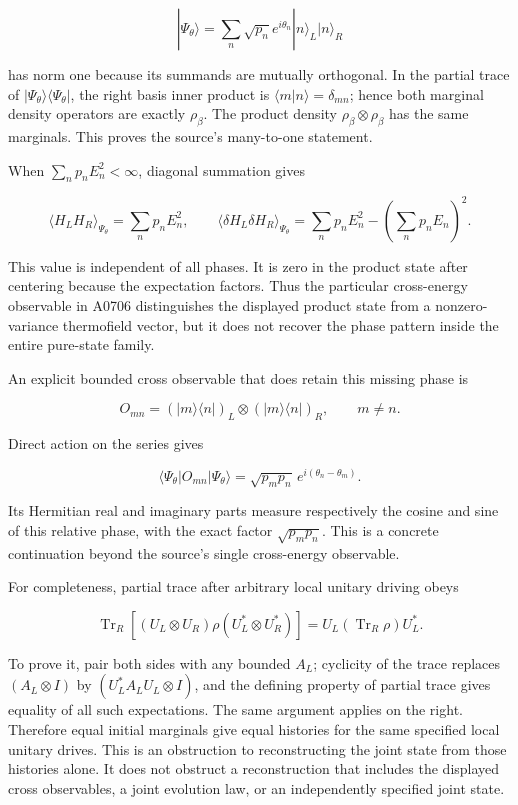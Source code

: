 \[
|\Psi_\theta\rangle=\sum_n\sqrt{p_n}e^{i\theta_n}|n\rangle_L|n\rangle_R
\]

has norm one because its summands are mutually orthogonal. In the
partial trace of \(|\Psi_\theta\rangle\langle\Psi_\theta|\), the right
basis inner product is \(\langle m|n\rangle=\delta_{mn}\); hence both
marginal density operators are exactly \(\rho_\beta\). The product
density \(\rho_\beta\otimes\rho_\beta\) has the same marginals. This
proves the source's many-to-one statement.

When \(\sum_n p_nE_n^2<\infty\), diagonal summation gives

\[
\langle H_LH_R\rangle_{\Psi_\theta}=\sum_n p_nE_n^2,
\qquad
\langle\delta H_L\delta H_R\rangle_{\Psi_\theta}
=\sum_n p_nE_n^2-\left(\sum_n p_nE_n\right)^2.
\]

This value is independent of all phases. It is zero in the product state
after centering because the expectation factors. Thus the particular
cross-energy observable in A0706 distinguishes the displayed product
state from a nonzero-variance thermofield vector, but it does not
recover the phase pattern inside the entire pure-state family.

An explicit bounded cross observable that does retain this missing phase
is

\[
O_{mn}=(|m\rangle\langle n|)_L\otimes(|m\rangle\langle n|)_R,
\qquad m\ne n.
\]

Direct action on the series gives

\[
\langle\Psi_\theta|O_{mn}|\Psi_\theta\rangle
=\sqrt{p_mp_n}\,e^{i(\theta_n-\theta_m)}.
\]

Its Hermitian real and imaginary parts measure respectively the cosine
and sine of this relative phase, with the exact factor
\(\sqrt{p_mp_n}\). This is a concrete continuation beyond the source's
single cross-energy observable.

For completeness, partial trace after arbitrary local unitary driving
obeys

\[
\operatorname{Tr}_R[(U_L\otimes U_R)\rho(U_L^*\otimes U_R^*)]
=U_L(\operatorname{Tr}_R\rho)U_L^*.
\]

To prove it, pair both sides with any bounded \(A_L\); cyclicity of the
trace replaces \((A_L\otimes I)\) by \((U_L^*A_LU_L\otimes I)\), and the
defining property of partial trace gives equality of all such
expectations. The same argument applies on the right. Therefore equal
initial marginals give equal histories for the same specified local
unitary drives. This is an obstruction to reconstructing the joint state
from those histories alone. It does not obstruct a reconstruction that
includes the displayed cross observables, a joint evolution law, or an
independently specified joint state.

